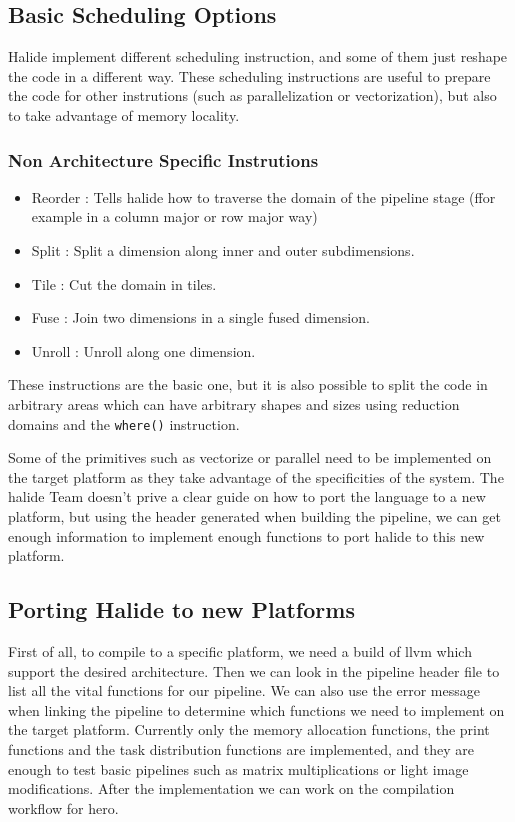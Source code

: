 	\subsection {Basic Scheduling Options}
	\label{section:scheduling}

	Halide implement different scheduling instruction, and some of them just reshape the code in a different way. These scheduling instructions are useful to prepare the code for other instrutions (such as parallelization or vectorization), but also to  take advantage of memory locality.
	\subsubsection{Non Architecture Specific Instrutions}
	\begin{itemize}
		\item Reorder : Tells halide how to traverse the domain of the pipeline stage (ffor example in a column major or row major way)
		\item Split   : Split a dimension along inner and outer subdimensions.
		\item Tile    : Cut the domain in tiles.
		\item Fuse    : Join two dimensions in a single fused dimension.
		\item Unroll  : Unroll along one dimension.
	\end{itemize}
	These instructions are the basic one, but it is also possible to split the code in arbitrary areas which can have arbitrary shapes and sizes using reduction domains and the \verb|where()| instruction.

	Some of the primitives such as vectorize or parallel need to be implemented on the target platform as they take advantage of the specificities of the system. The halide Team doesn't prive a clear guide on how to port the language to a new platform, but using the header generated when building the pipeline, we can get enough information to implement enough functions to port halide to this new platform.

	\subsection { Porting Halide to new Platforms}
		First of all, to compile to a specific platform, we need a build of llvm which support the desired architecture.
		Then we can look in the pipeline header file to list all the vital functions for our pipeline. We can also use the error message when linking the pipeline to determine which functions we need to implement on the target platform. 
		Currently only the memory allocation functions, the print functions and the task distribution functions are implemented, and they are enough to  test basic pipelines such as matrix multiplications or light image modifications.
	After the implementation we can work on the compilation workflow for hero.

